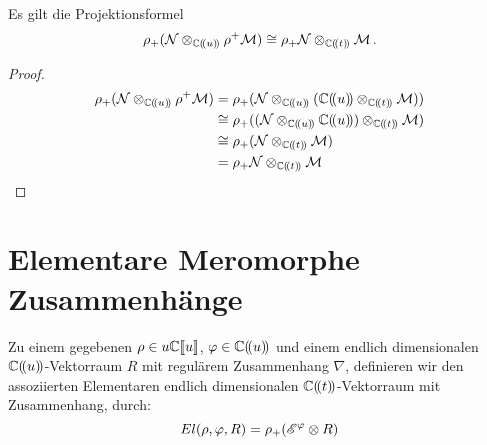 \begin{thm} \label{thm:Projektionsformel}
  \cite[1.a]{sabbah_Fourier-local}
  Es gilt die Projektionsformel
  \begin{equation} \label{eq:Projektionsformel}
    \rho_+(\mathcal{N}\otimes_{\mathbb{C}(\!(u)\!)}\rho^+\mathcal{M}) \cong
    \rho_+\mathcal{N}\otimes_{\mathbb{C}(\!(t)\!)}\mathcal{M}\,.
  \end{equation}
\end{thm}
\begin{proof}
  \begin{align*}
    \rho_+(\cN\otimes_{\C(\!(u)\!)}\rho^+\cM) &=
    \rho_+(\cN\otimes_{\C(\!(u)\!)}(\C(\!(u)\!)\otimes_{\C(\!(t)\!)}\cM)) \\
    &\cong \rho_+((\cN\otimes_{\C(\!(u)\!)}\C(\!(u)\!))
    \otimes_{\C(\!(t)\!)}\cM) \\
    &\cong \rho_+(\cN\otimes_{\C(\!(t)\!)}\cM) \\
    &= \rho_+\cN\otimes_{\C(\!(t)\!)}\cM \\
  \end{align*}
\end{proof}

\begin{comment}
  Sei $\rho(u)=u^p=t$ und $\phi(t)$ gegeben.
  \begin{align*}
    \rho^+\sE^{\phi(t)}&=\sE^{\phi(\rho(u))}=\sE^{\phi(u^p)}\\
    \rho^+\rho_+\sE^{\phi(u)}
      &=\underset{\zeta\in\mu_p}{\bigoplus}\sE^{\phi(\zeta\cdot u)}\\
  \end{align*}
\end{comment}

\section{Elementare Meromorphe Zusammenhänge}

\begin{defn}
  \cite[Def 2.1]{sabbah_Fourier-local}
  Zu einem gegebenen $\rho\in u\mathbb{C}\llbracket u\rrbracket$,
  $\varphi\in\mathbb{C}(\!(u)\!)$ und einem endlich dimensionalen
  $\mathbb{C}(\!(u)\!)$-Vektorraum $R$ mit regulärem Zusammenhang $\nabla$,
  definieren wir den assoziierten Elementaren endlich dimensionalen
  $\mathbb{C}(\!(t)\!)$-Vektorraum mit Zusammenhang, durch:
  \[
    El(\rho,\varphi,R)=\rho_+(\mathscr{E}^\varphi\otimes R)
  \]
\end{defn}


